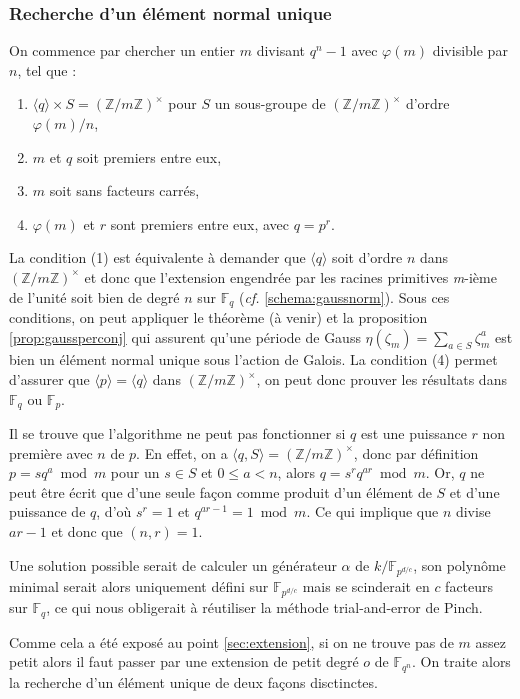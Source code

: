 \documentclass[a4paper]{article} %
\numberwithin{section}{part}
\numberwithin{equation}{section}
\newcommand\nroot[1]{\textit{#1}-ième}
\newcommand\zmodninv[1]{(\mathbb{Z}/#1\mathbb{Z})^{\times}}
\newcommand\GF[1]{\mathbb{F}_{#1}}
\begin{document}
\subsubsection*{Recherche d'un élément normal unique}
On commence par chercher un entier $m$ divisant $q^n - 1$ avec $\varphi(m)$
divisible par $n$, tel que :
\vspace{0.3cm}
\begin{enumerate}[(1)]
\item $\langle{q}\rangle \times S = \zmodninv{m}$ pour $S$ 
un sous-groupe de $\zmodninv{m}$ d'ordre $\varphi(m)/n$,
\item $m$ et $q$ soit premiers entre eux,
\item $m$ soit sans facteurs carrés,
\item $\varphi(m)$ et $r$ sont premiers entre eux, avec $q = p^r$.
\end{enumerate}
\vspace{0.3cm}
La condition (1) est équivalente à demander que $\langle{q}\rangle$ soit d'ordre
$n$ dans $\zmodninv{m}$ et donc que l'extension engendrée par les racines
primitives \nroot{m} de l'unité soit bien de degré $n$ sur $\GF{q}$ (\emph{cf.}
\ref{schema:gaussnorm}). Sous ces conditions, on peut appliquer le théorème (à
venir) et la proposition \ref{prop:gaussperconj} qui assurent qu'une période de 
Gauss $\eta(\zeta_m) = \sum_{a\in S}{\zeta_m^a}$ est bien un élément normal 
unique sous l'action de Galois. La condition (4) permet d'assurer que 
$\langle{p}\rangle = \langle{q}\rangle$ dans $\zmodninv{m}$, on peut donc 
prouver les résultats dans $\GF{q}$ ou $\GF{p}$.
\vspace{0.3cm}
\begin{rem}
Il se trouve que l'algorithme ne peut pas fonctionner si $q$  est une 
puissance $r$ non première avec $n$ de $p$. En effet, on a $\langle{q,S}\rangle 
= \zmodninv{m}$, donc par définition $p = sq^a\bmod m$ pour un $s\in S$ et $0 
\leq a < n$, alors $q=s^rq^{ar} \bmod m$. 
Or, $q$ ne peut être écrit que d'une seule façon comme produit d'un élément de 
$S$ et d'une puissance de $q$, d'où $s^r = 1$ et $q^{ar - 1} = 1 \bmod m$. 
Ce qui implique que $n$ divise $ar - 1$ et donc que $(n, r) = 1$.\par
Une solution possible serait de calculer un générateur $\alpha$ de 
$k/\GF{p^{d/c}}$, son polynôme minimal serait alors uniquement défini sur 
$\GF{p^{d/c}}$ mais se scinderait en $c$ facteurs sur $\GF{q}$, ce qui nous 
obligerait à réutiliser la méthode trial-and-error de Pinch.
\end{rem}
\vspace{0.3cm}
Comme cela a été exposé au point \ref{sec:extension}, si on ne trouve pas de $m$
assez petit alors il faut passer par une extension de petit degré $o$ de
$\GF{q^n}$. On traite alors la recherche d'un élément unique de deux façons
disctinctes.
 
\end{document}
